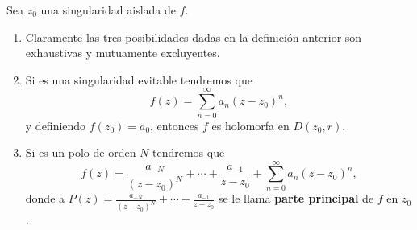 \begin{observation}
Sea $\displaystyle z_{0} $ una singularidad aislada de $\displaystyle f $. 
\begin{enumerate}
\item Claramente las tres posibilidades dadas en la definición anterior son exhaustivas y mutuamente excluyentes.
\item Si es una singularidad evitable tendremos que 
	\[f\left(z\right)=\sum^{\infty}_{n = 0}a_{n}\left(z-z_{0}\right)^{n} ,\]
	y definiendo $\displaystyle f\left(z_{0}\right)=a_{0} $, entonces $\displaystyle f $ es holomorfa en $\displaystyle D\left(z_{0}, r\right) $. 
\item Si es un polo de orden $\displaystyle N $ tendremos que 
	\[f\left(z\right)=\frac{a_{-N}}{\left(z-z_{0}\right)^{N}} + \cdots + \frac{a_{-1}}{z-z_{0}}+\sum^{\infty}_{n = 0}a_{n}\left(z-z_{0}\right)^{n} ,\]
	donde a $\displaystyle P\left(z\right)=\frac{a_{-N}}{\left(z-z_{0}\right)^{N}} + \cdots + \frac{a_{-1}}{z-z_{0}} $ se le llama \textbf{parte principal} de $\displaystyle f $ en $\displaystyle z_{0} $. 
\end{enumerate}
\end{observation}

